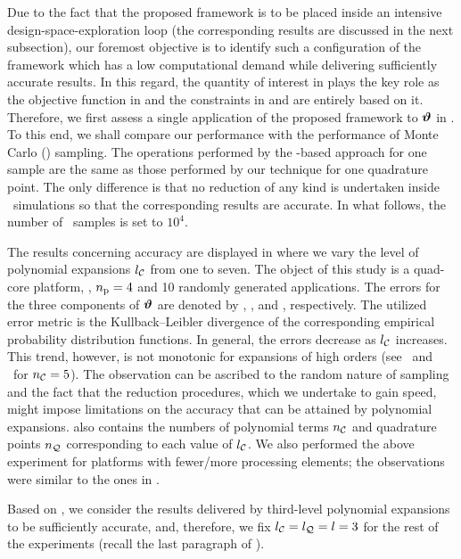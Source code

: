 Due to the fact that the proposed framework is to be placed inside an intensive design-space-exploration loop (the corresponding results are discussed in the next subsection), our foremost objective is to identify such a configuration of the framework which has a low computational demand while delivering sufficiently accurate results.
In this regard, the quantity of interest in  plays the key role as the objective function in  and the constraints in  and  are entirely based on it.
Therefore, we first assess a single application of the proposed framework to $\bm{\vartheta}$ in .
To this end, we shall compare our performance with the performance of Monte Carlo (\MC) sampling.
The operations performed by the \MC-based approach for one sample are the same as those performed by our technique for one quadrature point.
The only difference is that no reduction of any kind is undertaken inside \MC\ simulations so that the corresponding results are accurate.
In what follows, the number of \MC\ samples is set to $10^4$.


The results concerning accuracy are displayed in  where we vary the level of polynomial expansions ${l_\mathcal{C}}$ from one to seven.
The object of this study is a quad-core platform, \ie, ${n_\text{p}} = 4$ and 10 randomly generated applications.
The errors for the three components of $\bm{\vartheta}$ are denoted by \errorE, \errorQ, and \errorT, respectively.
The utilized error metric is the Kullback--Leibler divergence of the corresponding empirical probability distribution functions.
In general, the errors decrease as ${l_\mathcal{C}}$ increases.
This trend, however, is not monotonic for expansions of high orders (see \errorQ\ and \errorT\ for ${n_\mathcal{C}} = 5$).
The observation can be ascribed to the random nature of sampling and the fact that the reduction procedures, which we undertake to gain speed, might impose limitations on the accuracy that can be attained by polynomial expansions.
 also contains the numbers of polynomial terms ${n_\mathcal{C}}$ and quadrature points ${n_\mathcal{Q}}$ corresponding to each value of ${l_\mathcal{C}}$.
We also performed the above experiment for platforms with fewer/more processing elements; the observations were similar to the ones in .

Based on , we consider the results delivered by third-level polynomial expansions to be sufficiently accurate, and, therefore, we fix ${l_\mathcal{C}} = {l_\mathcal{Q}} = l = 3$ for the rest of the experiments (recall the last paragraph of ).

